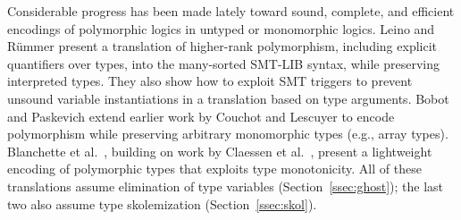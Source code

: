 Considerable progress has been made lately toward sound, complete, and efficient
encodings of polymorphic logics in untyped or monomorphic logics. Leino and
R\"ummer \cite{leino-ruemmer-2010} present a translation of higher-rank
polymorphism, including explicit quantifiers over types, into the many-sorted
SMT-LIB syntax, while preserving interpreted types. They also show how to
exploit SMT triggers to prevent unsound variable instantiations in a
translation based on type arguments. Bobot and Paskevich
\cite{bobot-paskevich-2011} extend earlier work by Couchot and Lescuyer
\cite{couchot-lescuyer-2007} to encode polymorphism while preserving
arbitrary monomorphic types (e.g., array types).
Blanchette et
al.\ \cite{blanchette-et-al-2013-types}, building on work by Claessen et al.\
\cite{claessen-et-al-2011}, present a %
lightweight encoding of
polymorphic types that exploits type monotonicity. All of these translations
assume %
elimination of \theghost{} type variables
(Section~\ref{ssec:ghost}); the last two also assume type skolemization
(Section~\ref{ssec:skol}).

